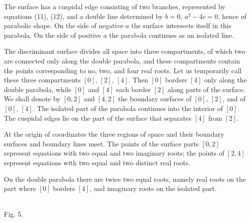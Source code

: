 \documentclass[11pt]{article}
\begin{document}
The surface has a cuspidal edge consisting of two branches, represented by equations (11), (12), and a double line determined by $b=0$, $a^2-4c=0$, hence of parabolic shape. On the side of negative $a$ the surface intersects itself in this parabola. On the side of positive $a$ the parabola continues as an isolated line.

The discriminant surface divides all space into three compartments, of which two are connected only along the double parabola, and these compartments contain the points corresponding to no, two, and four real roots. Let us temporarily call these three compartments $[0]$, $[2]$, $[4]$. Then $[0]$ borders $[4]$ only along the double parabola, while $[0]$ and $[4]$ each border $[2]$ along parts of the surface. We shall denote by $[0,2]$ and $[4,2]$ the boundary surfaces of $[0]$, $[2]$, and of $[0]$, $[4]$. The isolated part of the parabola continues into the interior of $[0]$. The cuspidal edges lie on the part of the surface that separates $[4]$ from $[2]$.

At the origin of coordinates the three regions of space and their boundary surfaces and boundary lines meet. The points of the surface parts $[0,2]$ represent equations with two equal and two imaginary roots; the points of $[2,4]$ represent equations with two equal and two distinct real roots.

On the double parabola there are twice two equal roots, namely real roots on the part where $[0]$ borders $[4]$, and imaginary roots on the isolated part.


\begin{center}
\\[0.4em]Fig. 5.
\end{center}
\end{document}
